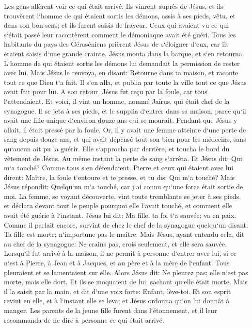 \verse Les gens allèrent voir ce qui était arrivé. Ils vinrent auprès de Jésus, et ils trouvèrent l`homme de qui étaient sortis les démons, assis à ses pieds, vêtu, et dans son bon sens; et ils furent saisis de frayeur. 
\verse Ceux qui avaient vu ce qui s`était passé leur racontèrent comment le démoniaque avait été guéri. 
\verse Tous les habitants du pays des Géraséniens prièrent Jésus de s`éloigner d`eux, car ils étaient saisis d`une grande crainte. Jésus monta dans la barque, et s`en retourna. 
\verse L`homme de qui étaient sortis les démons lui demandait la permission de rester avec lui. Mais Jésus le renvoya, en disant: 
\verse Retourne dans ta maison, et raconte tout ce que Dieu t`a fait. Il s`en alla, et publia par toute la ville tout ce que Jésus avait fait pour lui. 
\verse A son retour, Jésus fut reçu par la foule, car tous l`attendaient. 
\verse Et voici, il vint un homme, nommé Jaïrus, qui était chef de la synagogue. Il se jeta à ses pieds, et le supplia d`entrer dans sa maison, 
\verse parce qu`il avait une fille unique d`environ douze ans qui se mourait. Pendant que Jésus y allait, il était pressé par la foule. 
\verse Or, il y avait une femme atteinte d`une perte de sang depuis douze ans, et qui avait dépensé tout son bien pour les médecins, sans qu`aucun ait pu la guérir. 
\verse Elle s`approcha par derrière, et toucha le bord du vêtement de Jésus. Au même instant la perte de sang s`arrêta. 
\verse Et Jésus dit: Qui m`a touché? Comme tous s`en défendaient, Pierre et ceux qui étaient avec lui dirent: Maître, la foule t`entoure et te presse, et tu dis: Qui m`a touché? 
\verse Mais Jésus répondit: Quelqu`un m`a touché, car j`ai connu qu`une force était sortie de moi. 
\verse La femme, se voyant découverte, vint toute tremblante se jeter à ses pieds, et déclara devant tout le peuple pourquoi elle l`avait touché, et comment elle avait été guérie à l`instant. 
\verse Jésus lui dit: Ma fille, ta foi t`a sauvée; va en paix. 
\verse Comme il parlait encore, survint de chez le chef de la synagogue quelqu`un disant: Ta fille est morte; n`importune pas le maître. 
\verse Mais Jésus, ayant entendu cela, dit au chef de la synagogue: Ne crains pas, crois seulement, et elle sera sauvée. 
\verse Lorsqu`il fut arrivé à la maison, il ne permit à personne d`entrer avec lui, si ce n`est à Pierre, à Jean et à Jacques, et au père et à la mère de l`enfant. 
\verse Tous pleuraient et se lamentaient sur elle. Alors Jésus dit: Ne pleurez pas; elle n`est pas morte, mais elle dort. 
\verse Et ils se moquaient de lui, sachant qu`elle était morte. 
\verse Mais il la saisit par la main, et dit d`une voix forte: Enfant, lève-toi. 
\verse Et son esprit revint en elle, et à l`instant elle se leva; et Jésus ordonna qu`on lui donnât à manger. 
\verse Les parents de la jeune fille furent dans l`étonnement, et il leur recommanda de ne dire à personne ce qui était arrivé. 

